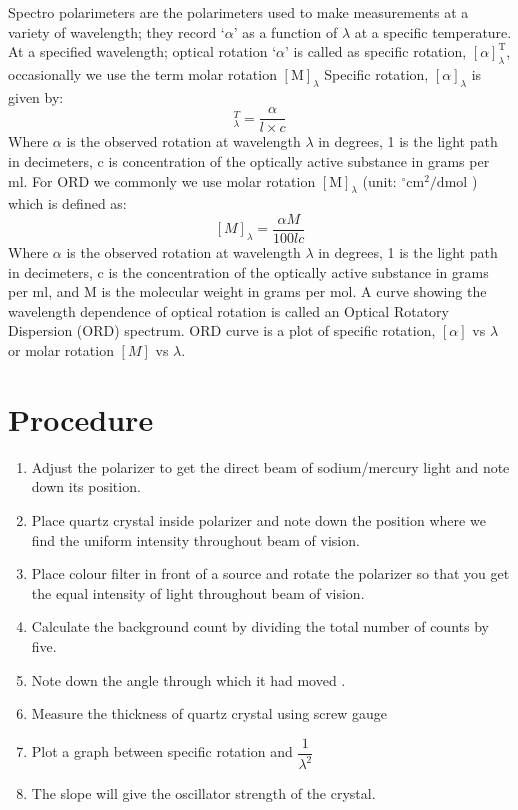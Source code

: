 	Spectro polarimeters are the polarimeters used to make measurements at a variety of wavelength; they record `$\alpha$' as a function of $\lambda$ at a specific temperature. At a specified wavelength; optical rotation `$\alpha$' is called as specific rotation, $[\alpha]^{\mathrm{T}}_{\lambda}$, occasionally we use the term molar rotation $[\mathrm{M}]_{\lambda}$ Specific rotation, $[\alpha]_{\lambda}$ is given by:
	\begin{equation}
		[\alpha]_{\lambda}^{T}=\frac{\alpha}{l \times c}
	\end{equation}
	Where $\alpha$ is the observed rotation at wavelength $\lambda$ in degrees, 1 is the light path in decimeters, $\mathrm{c}$ is concentration of the optically active substance in grams per ml. For ORD we commonly we use molar rotation $[\mathrm{M}]_{\lambda}$ (unit: $^{\circ} \mathrm{cm}^{2} / \mathrm{dmol}$ ) which is defined as:
	$$
	[M]_{\lambda}=\frac{\alpha M}{100 l c}
	$$
	Where $\alpha$ is the observed rotation at wavelength $\lambda$ in degrees, 1 is the light path in decimeters, $\mathrm{c}$ is the concentration of the optically active substance in grams per $\mathrm{ml}$, and $\mathrm{M}$ is the molecular weight in grams per mol. A curve showing the wavelength dependence of optical rotation is called an Optical Rotatory Dispersion (ORD) spectrum. ORD curve is a plot of specific rotation, $[\alpha]$ vs $\lambda$ or molar rotation $[M]$ vs $\lambda$.
	
	
	
	
	\section{Procedure}
	
	\begin{enumerate}
		\item 	 Adjust the polarizer to get the direct beam of sodium/mercury light and note down its position.
		\item 	Place quartz crystal inside polarizer and note down the position where we find the uniform intensity throughout beam of vision.
		\item 	 Place colour filter in front of a source and rotate the polarizer so that you get the equal intensity of light throughout beam of vision.
		\item  	Calculate the background count by dividing the total number of counts by five.
		\item 	Note down  the angle through which it had  moved . 
		
		
		\item  	 Measure the thickness of quartz crystal using screw gauge
		
		
		\item 	Plot a graph between specific rotation and $\dfrac{1}{\lambda^2}$
		\item The slope will give the oscillator strength of the crystal. 
		
	\end{enumerate}
	
